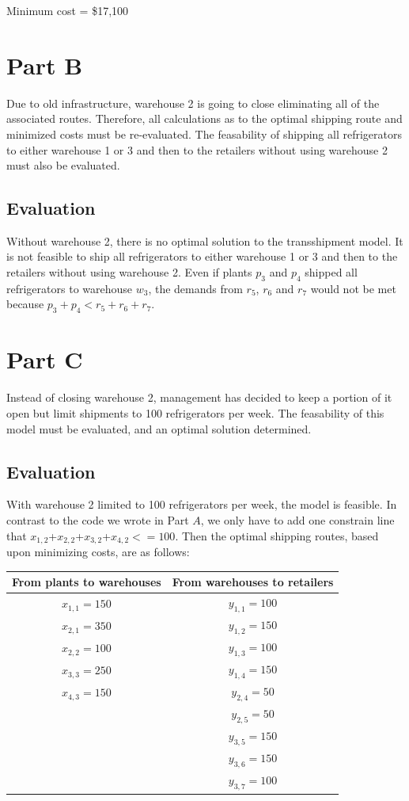 \documentclass[11pt]{scrreprt}
\begin{document}
Minimum cost = \$17,100

\section{Part B}
Due to old infrastructure, warehouse 2 is going to close eliminating 
all of the associated routes. Therefore, all calculations as to the
optimal shipping route and minimized costs must be re-evaluated. The 
feasability of shipping all refrigerators to either warehouse 1 or 3
and then to the retailers without using warehouse 2 must also be
evaluated.

\subsection{Evaluation}
Without warehouse 2, there is no optimal solution to the transshipment 
model. It is not feasible to ship all refrigerators to either warehouse
1 or 3 and then to the retailers without using warehouse 2. Even if 
plants $p_3$ and $p_4$ shipped all refrigerators to warehouse $w_3$, 
the demands from $r_5$, $r_6$ and $r_7$ would not be met because
$p_3 + p_4 < r_5 + r_6 + r_7$.

\section{Part C}
Instead of closing warehouse 2, management has decided to keep a 
portion of it open but limit shipments to 100 refrigerators per week. 
The feasability of this model must be evaluated, and an optimal 
solution determined.

\subsection{Evaluation}
With warehouse 2 limited to 100 refrigerators per week, the model is
feasible. In contrast to the code we wrote in Part $A$, we only have to add one constrain line that $x_{1,2}$+$x_{2,2}$+$x_{3,2}$+$x_{4,2}$$ <= 100$. Then the optimal shipping routes, based upon minimizing costs, 
are as follows: \\

\begin{tabular}{|c|c|}
	\hline From plants to warehouses & From warehouses to retailers \\
	\hline $x_{1,1} = 150$ & $y_{1,1} = 100$ \\
	\hline $x_{2,1} = 350$ & $y_{1,2} = 150$ \\
	\hline $x_{2,2} = 100$ & $y_{1,3} = 100$  \\
	\hline $x_{3,3} = 250$ & $y_{1,4} = 150$  \\
	\hline $x_{4,3} = 150$ & $y_{2,4} = 50$  \\
	\hline 				   & $y_{2,5} = 50$ \\
	\hline 				   & $y_{3,5} = 150$ \\
	\hline 				   & $y_{3,6} = 150$ \\
	\hline 				   & $y_{3,7} = 100$ \\
	\hline
\end{tabular} \\
\end{document}
